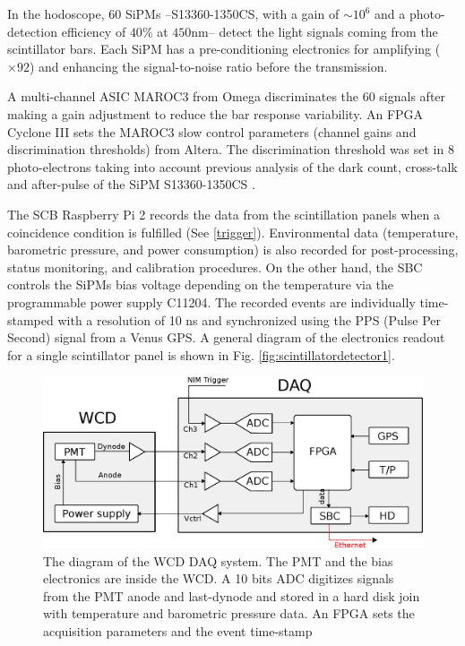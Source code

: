 \documentclass[letterpaper,11pt]{article}
\begin{document}
In the hodoscope, $60$ SiPMs --S13360-1350CS, with a gain of $\sim 10^6$ and a photo-detection efficiency of $40\%$ at $450$nm-- detect the light signals coming from the scintillator bars. Each SiPM has a pre-conditioning electronics for amplifying ($\times 92$) and enhancing the signal-to-noise ratio before the transmission. 

A multi-channel ASIC MAROC3 from Omega discriminates the $60$ 
signals after making a gain adjustment to reduce the bar response variability. An FPGA Cyclone III sets the MAROC3 slow control parameters (channel gains and discrimination thresholds) from Altera. The discrimination threshold was set in $8$ photo-electrons taking into account previous analysis of the dark count, cross-talk and after-pulse of the SiPM S13360-1350CS \cite{Villafrades2020}.

The SCB Raspberry Pi 2 records the data from the scintillation panels when a coincidence condition is fulfilled (See \ref{trigger}). Environmental data (temperature, barometric pressure, and power consumption) is also recorded for post-processing, status monitoring, and calibration procedures. On the other hand, the SBC controls the SiPMs bias voltage depending on the temperature via the programmable power supply C11204. The recorded events are individually time-stamped with a resolution of 10 ns and synchronized using the PPS (Pulse Per Second) signal from a Venus GPS. A general diagram of the electronics readout for a single scintillator panel is shown in Fig. \ref{fig:scintillatordetector1}.

\begin{figure}[htb]
\centering
\includegraphics[width=0.9\columnwidth]{Figures/WCDDAQ.eps}
\caption{The diagram of the WCD DAQ system. The PMT and the bias electronics are inside the WCD. A 10 bits ADC digitizes signals from the PMT anode and last-dynode and stored in a hard disk join with temperature and barometric pressure data. An FPGA sets the acquisition parameters and the event time-stamp}
  \label{fig:WCD}
\end{figure}
\end{document}
